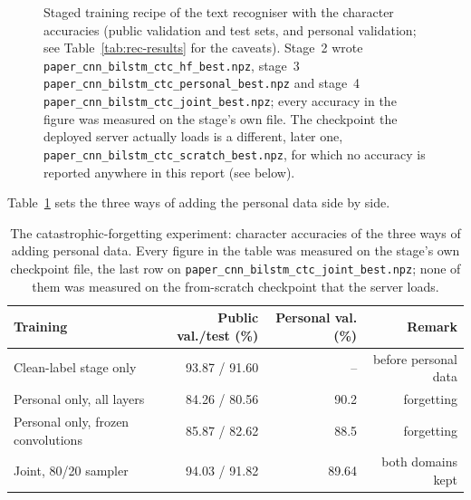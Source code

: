 \begin{figure}[h]
\centering
{}
\caption{Staged training recipe of the text recogniser with the character accuracies (public validation and test sets, and personal validation; see Table~\ref{tab:rec-results} for the caveats). Stage~2 wrote \texttt{paper\_cnn\_bilstm\_ctc\_hf\_best.npz}, stage~3 \texttt{paper\_cnn\_bilstm\_ctc\_personal\_best.npz} and stage~4 \texttt{paper\_cnn\_bilstm\_ctc\_joint\_best.npz}; every accuracy in the figure was measured on the stage's own file. The checkpoint the deployed server actually loads is a different, later one, \texttt{paper\_cnn\_bilstm\_ctc\_scratch\_best.npz}, for which no accuracy is reported anywhere in this report (see below).}
\label{fig:rec-stages}
\end{figure}

Table~\ref{tab:rec-forget} sets the three ways of adding the personal data side by side.

\begin{table}[h]
\centering
\fontsize{9.5}{11.5}\selectfont
\begin{tabular}{|l|r|r|r|}
\hline
\textbf{Training} & \textbf{Public val./test (\%)} & \textbf{Personal val. (\%)} & \textbf{Remark} \\
\hline
Clean-label stage only & 93.87 / 91.60 & -- & before personal data \\
Personal only, all layers & 84.26 / 80.56 & 90.2 & forgetting \\
Personal only, frozen convolutions & 85.87 / 82.62 & 88.5 & forgetting \\
Joint, 80/20 sampler & 94.03 / 91.82 & 89.64 & both domains kept \\
\hline
\end{tabular}
\caption{The catastrophic-forgetting experiment: character accuracies of the three ways of adding personal data. Every figure in the table was measured on the stage's own checkpoint file, the last row on \texttt{paper\_cnn\_bilstm\_ctc\_joint\_best.npz}; none of them was measured on the from-scratch checkpoint that the server loads.}
\label{tab:rec-forget}
\end{table}

